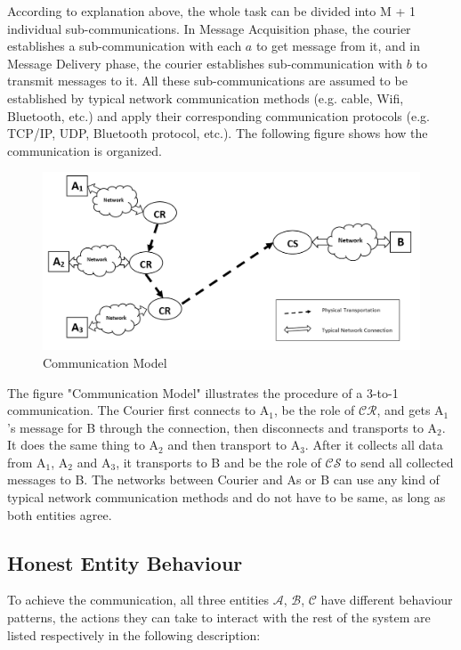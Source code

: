 According to explanation above, the whole task can be divided into M + 1 individual sub-communications. In Message Acquisition phase, the courier establishes a sub-communication with each $a$ to get message from it, and in Message Delivery phase, the courier establishes sub-communication with $b$ to transmit messages to it. All these sub-communications are assumed to be established by typical network communication methods (e.g. cable, Wifi, Bluetooth, etc.) and apply their corresponding communication protocols (e.g. TCP/IP, UDP, Bluetooth protocol, etc.). The following figure shows how the communication is organized.

\begin{figure}[h!]
\includegraphics[width=\textwidth,natwidth=1123,natheight=530]{figures/communicationmodel.png}
\caption{Communication Model}
\end{figure}

The figure "Communication Model" illustrates the procedure of a 3-to-1 communication. The Courier first connects to A$_1$, be the role of $\mathcal{CR}$, and gets A$_1$'s message for B through the connection, then disconnects and transports to A$_2$. It does the same thing to A$_2$ and then transport to A$_3$. After it collects all data from A$_1$, A$_2$ and A$_3$, it transports to B and be the role of $\mathcal{CS}$ to send all collected messages to B. The networks between Courier and As or B can use any kind of typical network communication methods and do not have to be same, as long as both entities agree. 

\subsection{Honest Entity Behaviour}
To achieve the communication, all three entities $ \mathcal{A} $, $ \mathcal{B} $, $ \mathcal{C} $ have different behaviour patterns, the actions they can take to interact with the rest of the system are listed respectively in the following description:

